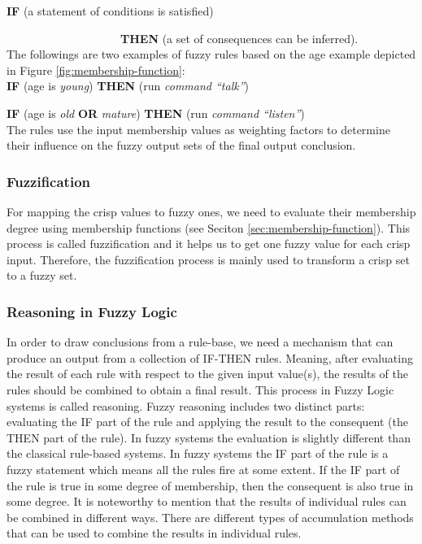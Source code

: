 \documentclass[11pt]{article}
\begin{document}
\noindent \textbf{IF} (a statement of conditions is satisfied)

$\qquad\qquad\qquad\qquad\qquad$\textbf{THEN} (a set of consequences can
be inferred).\\

The followings are two examples of fuzzy
rules based on the age example depicted in Figure
\ref{fig:membership-function}:\\

\textbf{IF} (age is \textit{young}) \textbf{THEN} (run \textit{command
``talk''})
 
\textbf{IF} (age is \textit{old} \textbf{OR} \textit{mature}) \textbf{THEN} (run
\textit{command ``listen''})\\

\noindent The rules use the input membership values as weighting factors to
determine their influence on the fuzzy output sets of the final output
conclusion.

\subsubsection{Fuzzification}
\label{sec:fuzzification}

For mapping the crisp values to fuzzy ones, we need to evaluate their membership
degree using membership functions (see Seciton \ref{sec:membership-function}).
This process is called fuzzification and it helps us to get one fuzzy value for
each crisp input. Therefore, the fuzzification process is mainly used to
transform a crisp set to a fuzzy set.

\subsubsection{Reasoning in Fuzzy Logic}
\label{sec:reasoning}

In order to draw conclusions from a rule-base, we need a mechanism that can
produce an output from a collection of IF-THEN rules. Meaning, after evaluating
the result of each rule with respect to the given input value(s), the results of
the rules should be combined to obtain a final result. This process in Fuzzy
Logic systems is called reasoning. Fuzzy reasoning includes two distinct parts:
evaluating the IF part of the rule and applying the result to the consequent
(the THEN part of the rule). In fuzzy systems the evaluation is slightly
different than the classical rule-based systems. In fuzzy systems the IF part of
the rule is a fuzzy statement which means all the rules fire at some extent. If
the IF part of the rule is true in some degree of membership, then the
consequent is also true in some degree. It is noteworthy to mention that the
results of individual rules can be combined in different ways. There are
different types of accumulation methods that can be used to combine the results
in individual rules.
\end{document}
